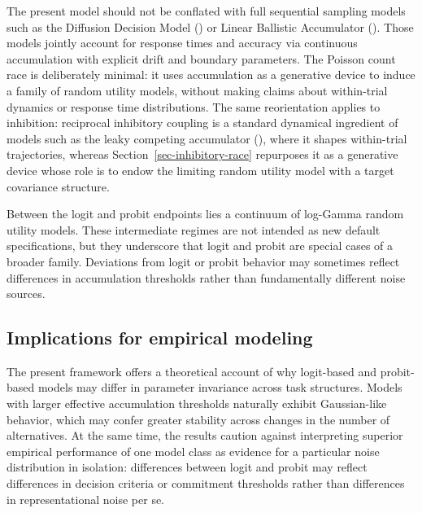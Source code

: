 \documentclass[
  man,
  floatsintext,
  longtable,
  a4paper,
  nolmodern,
  notxfonts,
  notimes,
  colorlinks=true,linkcolor=blue,citecolor=blue,urlcolor=blue]{apa7}
\begin{document}
The present model should not be conflated with full sequential sampling
models such as the Diffusion Decision Model
() or
Linear Ballistic Accumulator
(). Those models jointly account for response times and accuracy via
continuous accumulation with explicit drift and boundary parameters. The
Poisson count race is deliberately minimal: it uses accumulation as a
generative device to induce a family of random utility models, without
making claims about within-trial dynamics or response time
distributions. The same reorientation applies to inhibition: reciprocal
inhibitory coupling is a standard dynamical ingredient of models such as
the leaky competing accumulator
(), where it shapes within-trial trajectories, whereas
Section~\ref{sec-inhibitory-race} repurposes it as a generative device
whose role is to endow the limiting random utility model with a target
covariance structure.

Between the logit and probit endpoints lies a continuum of log-Gamma
random utility models. These intermediate regimes are not intended as
new default specifications, but they underscore that logit and probit
are special cases of a broader family. Deviations from logit or probit
behavior may sometimes reflect differences in accumulation thresholds
rather than fundamentally different noise sources.

\subsection{Implications for empirical
modeling}\label{implications-for-empirical-modeling}

The present framework offers a theoretical account of why logit-based
and probit-based models may differ in parameter invariance across task
structures. Models with larger effective accumulation thresholds
naturally exhibit Gaussian-like behavior, which may confer greater
stability across changes in the number of alternatives. At the same
time, the results caution against interpreting superior empirical
performance of one model class as evidence for a particular noise
distribution in isolation: differences between logit and probit may
reflect differences in decision criteria or commitment thresholds rather
than differences in representational noise per se.
\end{document}
